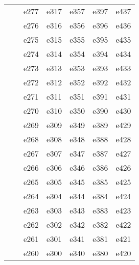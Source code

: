 \documentclass[10pt,letterpaper]{article}
\begin{document}
\begin{center}
\begin{tabular}{ |c|c|c|c|c|c|c| }
        &         & e277 & e317 & e357 & e397 & e437 \\
        &         & e276 & e316 & e356 & e396 & e436 \\
        &         & e275 & e315 & e355 & e395 & e435 \\
        &         & e274 & e314 & e354 & e394 & e434 \\
        &         & e273 & e313 & e353 & e393 & e433 \\
        &         & e272 & e312 & e352 & e392 & e432 \\
        &         & e271 & e311 & e351 & e391 & e431 \\
        &         & e270 & e310 & e350 & e390 & e430 \\
        &         & e269 & e309 & e349 & e389 & e429 \\
        &         & e268 & e308 & e348 & e388 & e428 \\
        &         & e267 & e307 & e347 & e387 & e427 \\
        &         & e266 & e306 & e346 & e386 & e426 \\
        &         & e265 & e305 & e345 & e385 & e425 \\
        &         & e264 & e304 & e344 & e384 & e424 \\
        &         & e263 & e303 & e343 & e383 & e423 \\
        &         & e262 & e302 & e342 & e382 & e422 \\
        &         & e261 & e301 & e341 & e381 & e421 \\
        &         & e260 & e300 & e340 & e380 & e420 \\

        \hline
        \end{tabular}
        \end{center}

    \clearpage
\end{document}
